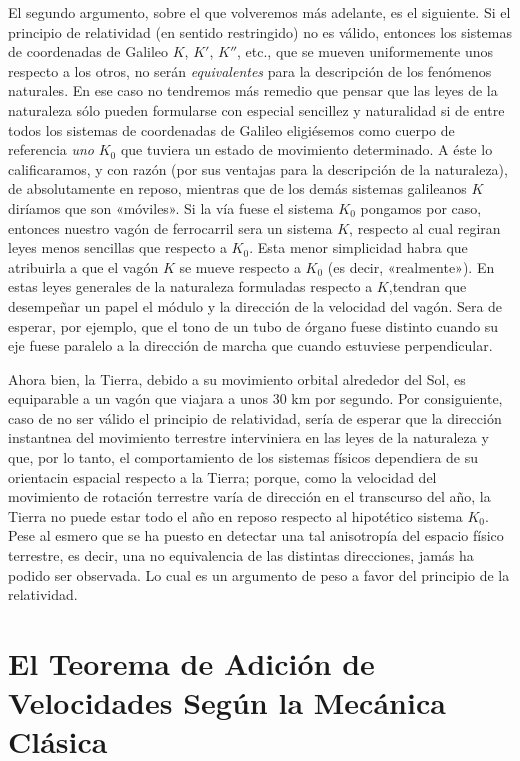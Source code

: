 \documentclass[spanish]{book}
\begin{document}
El segundo argumento, sobre el que volveremos más adelante, es el siguiente. Si el
principio de relatividad (en sentido restringido) no es válido, entonces los sistemas de
coordenadas de Galileo $K$, $K'$, $K''$, etc., que se mueven uniformemente unos respecto a 
los otros, no serán \textit{equivalentes} para la descripción de los fenómenos naturales. En ese
caso no tendremos más remedio que pensar que las leyes de la naturaleza sólo pueden
formularse con especial sencillez y naturalidad si de entre todos los sistemas de
coordenadas de Galileo eligiésemos como cuerpo de referencia \textit{uno} $K_{0}$ 
que tuviera un estado de movimiento determinado. A éste lo calificaramos, y con razón (por sus
ventajas para la descripción de la naturaleza), de absolutamente en reposo, mientras
que de los demás sistemas galileanos $K$ diríamos que son «móviles». Si la vía fuese el
sistema $K_{0}$ pongamos por caso, entonces nuestro vagón de ferrocarril sera un 
sistema $K$, respecto al cual regiran leyes menos sencillas que respecto a $K_{0}$.
Esta menor simplicidad habra que atribuirla a que el vagón $K$ se mueve respecto a
$K_{0}$ (es decir, «realmente»). En estas leyes generales de la naturaleza formuladas respecto a
$K$,tendran que desempeñar un papel el módulo y la dirección de la velocidad del vagón.
Sera de esperar, por ejemplo, que el tono de un tubo de órgano fuese distinto
cuando su eje fuese paralelo a la dirección de marcha que cuando estuviese
perpendicular.

Ahora bien, la Tierra, debido a su movimiento orbital alrededor del
Sol, es equiparable a un vagón que viajara a unos 30 km por segundo. Por
consiguiente, caso de no ser válido el principio de relatividad, sería de esperar que la
dirección instantnea del movimiento terrestre interviniera en las leyes de la
naturaleza y que, por lo tanto, el comportamiento de los sistemas físicos dependiera de
su orientacin espacial respecto a la Tierra; porque, como la velocidad del movimiento
de rotación terrestre varía de dirección en el transcurso del año, la Tierra no puede
estar todo el año en reposo respecto al hipotético sistema $K_{0}$. Pese al esmero que se ha
puesto en detectar una tal anisotropía del espacio físico terrestre, es decir, una no
equivalencia de las distintas direcciones, jamás ha podido ser observada. Lo cual es un
argumento de peso a favor del principio de la relatividad.

\chapter{El Teorema de Adición de Velocidades Según la Mecánica Clásica}
\end{document}
